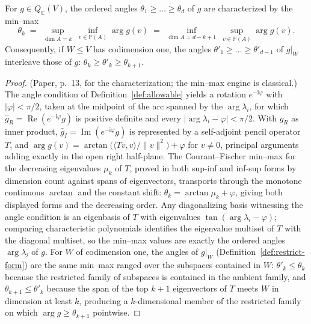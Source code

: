 \begin{lemma}
  \label{lem:eigenvalue-minmax}
  \leanok
  For $g \in Q_{\mathbb C}(V)$, the ordered angles
  $\theta_1 \geq \dots \geq \theta_d$ of $g$ are characterized by the min--max
  \[
    \theta_k \;=\; \sup_{\dim A = k}\ \inf_{v \in \mathbb P(A)} \arg g(v)
             \;=\; \inf_{\dim A = d-k+1}\ \sup_{v \in \mathbb P(A)} \arg g(v).
  \]
  Consequently, if $W \leq V$ has codimension one, the angles
  $\theta'_1 \geq \dots \geq \theta'_{d-1}$ of $g|_W$ interleave those of $g$:
  $\theta_k \geq \theta'_k \geq \theta_{k+1}$.
\end{lemma}

\begin{proof}
  \leanok
  (Paper, p.~13, for the characterization; the min--max engine is classical.)
  The angle condition of Definition~\ref{def:allowable} yields a rotation
  $e^{-\mathrm i \varphi}$ with $|\varphi| < \pi/2$, taken at the midpoint of
  the arc spanned by the $\arg \lambda_i$, for which
  $\hat g_R = \operatorname{Re}(e^{-\mathrm i \varphi} g)$ is positive definite
  and every $|\arg \lambda_i - \varphi| < \pi/2$. With $\hat g_R$ as inner
  product, $\hat g_I = \operatorname{Im}(e^{-\mathrm i \varphi} g)$ is
  represented by a self-adjoint pencil operator $T$, and
  $\arg g(v) = \arctan\bigl(\langle Tv, v\rangle / \|v\|^2\bigr) + \varphi$
  for $v \neq 0$, principal arguments adding exactly in the open right
  half-plane. The Courant--Fischer min--max for the decreasing eigenvalues
  $\mu_k$ of $T$, proved in both sup-inf and inf-sup forms by dimension count
  against spans of eigenvectors, transports through the monotone continuous
  $\arctan$ and the constant shift: $\theta_k = \arctan \mu_k + \varphi$,
  giving both displayed forms and the decreasing order. Any diagonalizing
  basis witnessing the angle condition is an eigenbasis of $T$ with
  eigenvalues $\tan(\arg \lambda_i - \varphi)$; comparing characteristic
  polynomials identifies the eigenvalue multiset of $T$ with the diagonal
  multiset, so the min--max values are exactly the ordered angles
  $\arg \lambda_i$ of $g$. For $W$ of codimension one, the angles of $g|_W$
  (Definition~\ref{def:restrict-form}) are the same min--max ranged over the
  subspaces contained in $W$: $\theta'_k \leq \theta_k$ because the restricted
  family of subspaces is contained in the ambient family, and
  $\theta_{k+1} \leq \theta'_k$ because the span of the top $k+1$ eigenvectors
  of $T$ meets $W$ in dimension at least $k$, producing a $k$-dimensional
  member of the restricted family on which $\arg g \geq \theta_{k+1}$
  pointwise.
\end{proof}

